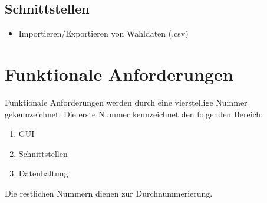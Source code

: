 \documentclass[10pt,a4paper]{article}
\begin{document}
\subsection{Schnittstellen}
\begin{itemize}
\item Importieren/Exportieren von Wahldaten (.csv)
\end{itemize}


\section{Funktionale Anforderungen}
Funktionale Anforderungen werden durch eine vierstellige Nummer gekennzeichnet. Die erste Nummer kennzeichnet den folgenden Bereich:
\begin{enumerate}
	\item GUI
	\item Schnittstellen
	\item Datenhaltung
\end{enumerate}
Die restlichen Nummern dienen zur Durchnummerierung.
\end{document}
